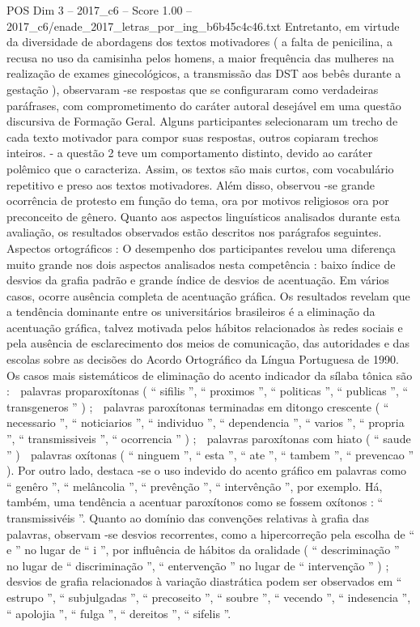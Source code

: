 \begin{textsample}{POS Dim 3 – 2017\_c6 – Score 1.00 – 2017\_c6/enade\_2017\_letras\_por\_ing\_b6b45c4c46.txt}
Entretanto, em virtude da diversidade de abordagens dos textos motivadores ( a falta de penicilina, a recusa no uso da camisinha pelos homens, a maior frequência das mulheres na realização de exames ginecológicos, a transmissão das DST aos bebês durante a gestação ), observaram -se respostas que se configuraram como verdadeiras paráfrases, com comprometimento do caráter autoral desejável em uma questão discursiva de Formação Geral.
Alguns participantes selecionaram um trecho de cada texto motivador para compor suas respostas, outros copiaram trechos inteiros. - a questão 2 teve um comportamento distinto, devido ao caráter polêmico que o caracteriza.
Assim, os textos são mais curtos, com vocabulário repetitivo e preso aos textos motivadores.
Além disso, observou -se grande ocorrência de protesto em função do tema, ora por motivos religiosos ora por preconceito de gênero.
Quanto aos aspectos linguísticos analisados durante esta avaliação, os resultados observados estão descritos nos parágrafos seguintes.
Aspectos ortográficos : O desempenho dos participantes revelou uma diferença muito grande nos dois aspectos analisados nesta competência : baixo índice de desvios da grafia padrão e grande índice de desvios de acentuação.
Em vários casos, ocorre ausência completa de acentuação gráfica.
Os resultados revelam que a tendência dominante entre os universitários brasileiros é a eliminação da acentuação gráfica, talvez motivada pelos hábitos relacionados às redes sociais e pela ausência de esclarecimento dos meios de comunicação, das autoridades e das escolas sobre as decisões do Acordo Ortográfico da Língua Portuguesa de 1990.
Os casos mais sistemáticos de eliminação do acento indicador da sílaba tônica são :  palavras proparoxítonas ( “ sifilis ”, “ proximos ”, “ politicas ”, “ publicas ”, “ transgeneros ” ) ;  palavras paroxítonas terminadas em ditongo crescente ( “ necessario ”, “ noticiarios ”, “ individuo ”, “ dependencia ”, “ varios ”, “ propria ”, “ transmissiveis ”, “ ocorrencia ” ) ;  palavras paroxítonas com hiato ( “ saude ” )  palavras oxítonas ( “ ninguem ”, “ esta ”, “ ate ”, “ tambem ”, “ prevencao ” ).
Por outro lado, destaca -se o uso indevido do acento gráfico em palavras como “ genêro ”, “ melâncolia ”, “ prevênção ”, “ intervênção ”, por exemplo.
Há, também, uma tendência a acentuar paroxítonos como se fossem oxítonos : “ transmissivéis ”.
Quanto ao domínio das convenções relativas à grafia das palavras, observam -se desvios recorrentes, como a hipercorreção pela escolha de “ e ” no lugar de “ i ”, por influência de hábitos da oralidade ( “ descriminação ” no lugar de “ discriminação ”, “ entervenção ” no lugar de “ intervenção ” ) ; desvios de grafia relacionados à variação diastrática podem ser observados em “ estrupo ”, “ subjulgadas ”, “ precoseito ”, “ soubre ”, “ vecendo ”, “ indesencia ”, “ apolojia ”, “ fulga ”, “ dereitos ”, “ sifelis ”.

\end{textsample}

